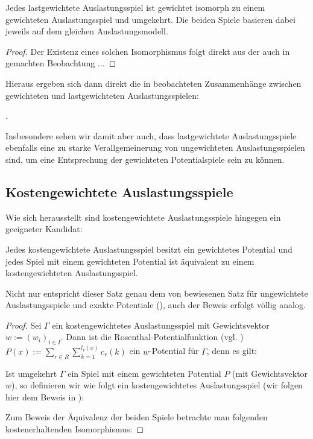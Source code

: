\begin{lemma}
	Jedes lastgewichtete Auslastungsspiel ist gewichtet isomorph zu einem gewichteten Auslastungsspiel und umgekehrt. Die beiden Spiele basieren dabei jeweils auf dem gleichen Auslastungsmodell.
\end{lemma}

\begin{proof}
	Der Existenz eines solchen Isomorphismus folgt direkt aus der auch in \cite{CharExGewPotinWCG} gemachten Beobachtung ...
\end{proof}

Hieraus ergeben sich dann direkt die in \cite{CharExGewPotinWCG} beobachteten Zusammenhänge zwischen gewichteten und lastgewichteten Auslastungsspielen:

\begin{kor}.
	
\end{kor}

Insbesondere sehen wir damit aber auch, dass lastgewichtete Auslastungsspiele ebenfalls eine zu starke Verallgemeinerung von ungewichteten Auslastungsspielen sind, um eine Entsprechung der gewichteten Potentialspiele sein zu können.


\subsection{Kostengewichtete Auslastungsspiele}

Wie sich herausstellt sind kostengewichtete Auslastungsspiele hingegen ein geeigneter Kandidat:

\begin{satz}
	Jedes kostengewichtete Auslastungsspiel besitzt ein gewichtetes Potential und jedes Spiel mit einem gewichteten Potential ist äquivalent zu einem kostengewichteten Auslastungsspiel.
\end{satz}

Nicht nur entspricht dieser Satz genau dem von \citeauthor{MonShap} bewiesenen Satz für ungewichtete Auslastungsspiele und exakte Potentiale (), auch der Beweis erfolgt völlig analog. 

\begin{proof}
	Sei $\Gamma$ ein kostengewichtetes Auslastungsspiel mit Gewichtsvektor $w := (w_i)_{i\in I}$. Dann ist die Rosenthal-Potentialfunktion (vgl. \cite{RosenthalPotential}) $P(x) := \sum_{r \in R}\sum_{k=1}^{l_r(x)}c_r(k)$ ein $w$-Potential für $\Gamma$, denn es gilt:
	
		
	Ist umgekehrt $\Gamma$ ein Spiel mit einem gewichteten Potential $P$ (mit Gewichtsvektor $w$), so definieren wir wie folgt ein kostengewichtetes Auslastungsspiel (wir folgen hier dem Beweis in \cite[Theorem 1]{MultiPotGames}):
	
	
	Zum Beweis der Äquivalenz der beiden Spiele betrachte man folgenden kostenerhaltenden Isomorphismus:
	
\end{proof}

